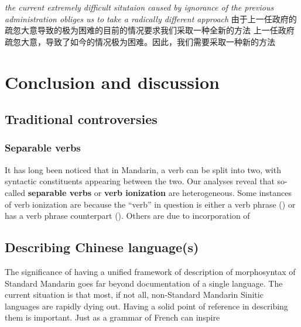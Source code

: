\documentclass[UTF8, a4paper, oneside, scheme=plain, 12pt]{ctexrep}
\newcommand*{\concept}[1]{\textbf{#1}}
\newcommand{\form}[1]{\emph{#1}}
\begin{document}
\begin{exe}
    \ex\begin{xlist}
        \ex \form{the current extremely difficult situtaion caused by ignorance of the previous administration obliges us to take a radically different approach}
        \ex 由于上一任政府的疏忽大意导致的极为困难的目前的情况要求我们采取一种全新的方法
        \ex 上一任政府疏忽大意，导致了如今的情况极为困难。因此，我们需要采取一种新的方法
    \end{xlist}
\end{exe}

\chapter{Conclusion and discussion}

\section{Traditional controversies}

\subsection{Separable verbs}

It has long been noticed that in Mandarin,
a verb can be split into two, with syntactic constituents appearing between the two.
Our analyses reveal that so-called \concept{separable verbs} or \concept{verb ionization} are heterogeneous.
Some instances of verb ionization are because the ``verb'' in question
is either a verb phrase () or has a verb phrase counterpart ().
Others are due to incorporation of 

\section{Describing Chinese language(s)}

The significance of having a unified framework of description of morphosyntax of Standard Mandarin
goes far beyond documentation of a single language.
The current situation is that most, if not all, non-Standard Mandarin Sinitic languages
are rapidly dying out.
Having a solid point of reference in describing them is important.
Just as a grammar of French can inspire 

\printbibliography
\end{document}
